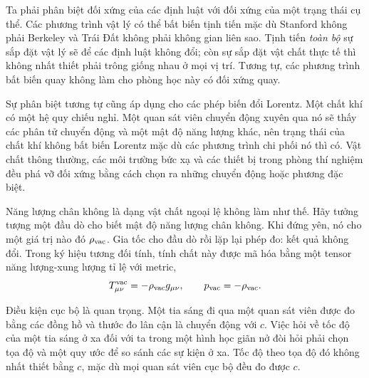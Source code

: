 Ta phải phân biệt đối xứng của các định luật với đối xứng của một trạng thái cụ thể. Các phương trình vật lý có thể bất biến tịnh tiến mặc dù Stanford không phải Berkeley và Trái Đất không phải không gian liên sao. Tịnh tiến \emph{toàn bộ} sự sắp đặt vật lý sẽ để các định luật không đổi; còn sự sắp đặt vật chất thực tế thì không nhất thiết phải trông giống nhau ở mọi vị trí. Tương tự, các phương trình bất biến quay không làm cho phòng học này có đối xứng quay.

Sự phân biệt tương tự cũng áp dụng cho các phép biến đổi Lorentz. Một chất khí có một hệ quy chiếu nghỉ. Một quan sát viên chuyển động xuyên qua nó sẽ thấy các phân tử chuyển động và một mật độ năng lượng khác, nên trạng thái của chất khí không bất biến Lorentz mặc dù các phương trình chi phối nó thì có. Vật chất thông thường, các môi trường bức xạ và các thiết bị trong phòng thí nghiệm đều phá vỡ đối xứng bằng cách chọn ra những chuyển động hoặc phương đặc biệt.

Năng lượng chân không là dạng vật chất ngoại lệ không làm như thế. Hãy tưởng tượng một đầu dò cho biết mật độ năng lượng chân không. Khi đứng yên, nó cho một giá trị nào đó \(\rho_{\rm vac}\). Gia tốc cho đầu dò rồi lặp lại phép đo: kết quả không đổi. Trong ký hiệu tương đối tính, tính chất này được mã hóa bằng một tensor năng lượng-xung lượng tỉ lệ với metric,
\begin{equation}
T_{\mu\nu}^{\rm vac}=-\rho_{\rm vac}g_{\mu\nu},
\qquad
p_{\rm vac}=-\rho_{\rm vac}.
\label{eq:l08-vacuum-stress}
\end{equation}

Điều kiện cục bộ là quan trọng. Một tia sáng đi qua một quan sát viên được đo bằng các đồng hồ và thước đo lân cận là chuyển động với \(c\). Việc hỏi về tốc độ của một tia sáng ở xa đối với ta trong một hình học giãn nở đòi hỏi phải chọn tọa độ và một quy ước để so sánh các sự kiện ở xa. Tốc độ theo tọa độ đó không nhất thiết bằng \(c\), mặc dù mọi quan sát viên cục bộ đều đo được \(c\).

\begin{classroomqa}
\end{classroomqa}

